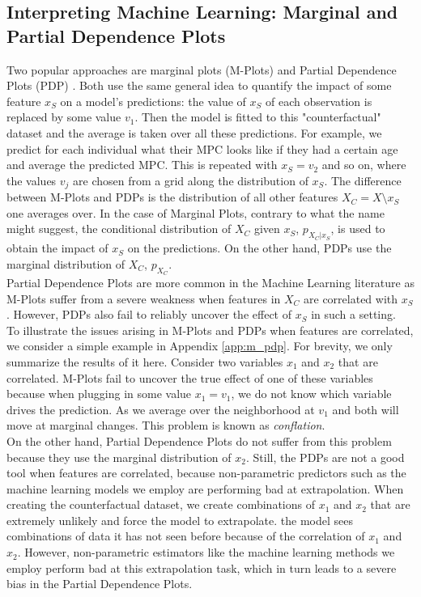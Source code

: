 \subsection{Interpreting Machine Learning: Marginal and Partial Dependence Plots} \label{subsec:m_pdp}
Two popular approaches are marginal plots (M-Plots) \citep{molnar_2019} and Partial Dependence Plots (PDP) \citep{friedman_2001}. Both use the same general idea to quantify the impact of some feature $x_S$ on a model's predictions: the value of $x_S$ of each observation is replaced by some value $v_1$. Then the model is fitted to this "counterfactual" dataset and the average is taken over all these predictions. For example, we predict for each individual what their MPC looks like if they had a certain age and average the predicted MPC. This is repeated with $x_S=v_2$ and so on, where the values $v_j$ are chosen from a grid along the distribution of $x_S$. The difference between M-Plots and PDPs is the distribution of all other features $X_C=X\setminus x_S$ one averages over. In the case of Marginal Plots, contrary to what the name might suggest, the conditional distribution of $X_C$ given $x_S$, $p_{X_C|x_S}$, is used to obtain the impact of $x_S$ on the predictions. On the other hand, PDPs use the marginal distribution of $X_C$, $p_{X_C}$. \\
Partial Dependence Plots are more common in the Machine Learning literature as M-Plots suffer from a severe weakness when features in $X_C$ are correlated with $x_S$. However, PDPs also fail to reliably uncover the effect of $x_S$ in such a setting. \\
To illustrate the issues arising in M-Plots and PDPs when features are correlated, we consider a simple example in Appendix \ref{app:m_pdp}. For brevity, we only summarize the results of it here. Consider two variables $x_1$ and $x_2$ that are correlated. M-Plots fail to uncover the true effect of one of these variables because when plugging in some value $x_1=v_1$, we do not know which variable drives the prediction. As we average over the neighborhood at $v_1$ and both will move at marginal changes. This problem is known as \textit{conflation}. \\
On the other hand, Partial Dependence Plots do not suffer from this problem because they use the marginal distribution of $x_2$. 
Still, the PDPs are not a good tool when features are correlated, because non-parametric predictors such as the machine learning models we employ are performing bad at extrapolation. When creating the counterfactual dataset, we create combinations of $x_1$ and $x_2$ that are extremely unlikely and force the model to extrapolate.  the model sees combinations of data it has not seen before because of the correlation of $x_1$ and $x_2$. However, non-parametric estimators like the machine learning methods we employ perform bad at this extrapolation task, which in turn leads to a severe bias in the Partial Dependence Plots. \citep{apleyzhu_2020} \\
